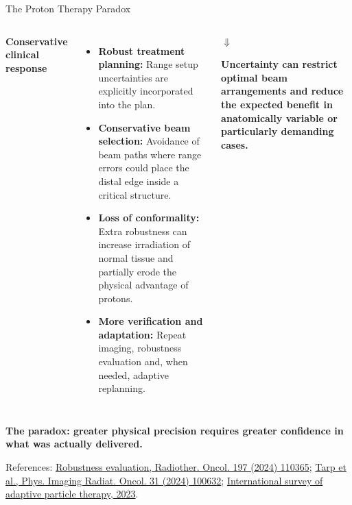 \documentclass[aspectratio=169,11pt]{beamer}
\begin{document}
\begin{frame}{The Proton Therapy Paradox}
\begin{columns}[T,onlytextwidth]
{\normalsize\bfseries\color{PTblue}
Conservative clinical response
}

\vspace{0.30cm}

{\tiny
\begin{itemize}
    \item \textbf{Robust treatment planning:} Range setup uncertainties are explicitly incorporated into the plan.
    \item \textbf{Conservative beam selection:} Avoidance of beam paths where range errors could place the distal edge
inside a critical structure.
    \item \textbf{Loss of conformality:} Extra robustness can increase irradiation of normal tissue and partially erode the physical advantage of protons.
    \item\textbf{More verification and adaptation:} Repeat imaging, robustness evaluation and, when needed, adaptive replanning.

\end{itemize}
}
\begin{center}
{\Large\bfseries\color{PTred}
$\Downarrow$
}

\vspace{0.08cm}

{\scriptsize\bfseries\color{PTred}
Uncertainty can restrict optimal beam arrangements and reduce the expected benefit in anatomically variable or particularly demanding cases.
}
\end{center}

\end{columns}

\vfill

\begin{center}
{\large\bfseries\color{PTred}
The paradox: greater physical precision requires greater confidence in what was actually delivered.
}
\end{center}

\vspace{0.08cm}

{\tiny\color{PTgray}
References:
\href{https://doi.org/10.1016/j.radonc.2024.110365}
{Robustness evaluation, Radiother. Oncol. 197 (2024) 110365};
\href{https://doi.org/10.1016/j.phro.2024.100632}
{Tarp et al., Phys. Imaging Radiat. Oncol. 31 (2024) 100632};
\href{https://doi.org/10.1016/j.phro.2023.100412}
{International survey of adaptive particle therapy, 2023}.
}

\end{frame}
\end{document}
